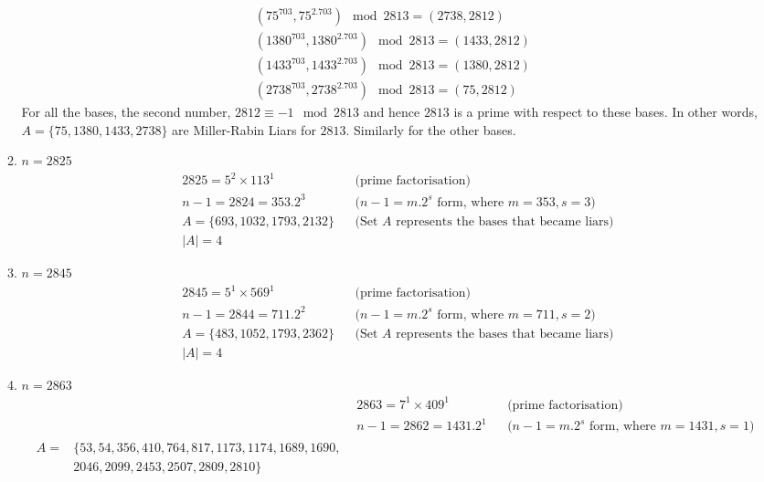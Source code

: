 \documentclass[11pt,a4paper]{article}
\begin{document}
\begin{enumerate}[1.]
\begin{flushleft}
\begin{enumerate}[1.]
				\begin{align}
					(75^{703}, 75^{2.703})\mod 2813 = (2738, 2812)\\
					(1380^{703}, 1380^{2.703})\mod 2813 = (1433, 2812)\\
					(1433^{703}, 1433^{2.703})\mod 2813 = (1380, 2812)\\
					(2738^{703}, 2738^{2.703})\mod 2813 = (75, 2812)
				\end{align}
				For all the bases, the second number, $2812 \equiv -1 \mod 2813$ and hence $2813$ is a prime with respect to these bases. In other words, $A = \{75, 1380, 1433, 2738\}$ are Miller-Rabin Liars for $2813$. Similarly for the other bases.
				\medbreak
				\item $n = 2825$
				\begin{align}
					& 2825 = 5^2 \times 113^1 &&\text{(prime factorisation)}\nonumber\\
					& n - 1 = 2824 = 353.2^3 &&\text{($n - 1 = m.2^s$ form, where $m = 353, s = 3$)}\nonumber\\
					& A = \{693, 1032, 1793, 2132\}&&\text{(Set $A$ represents the bases that became liars)} \nonumber\\
					& |A| = 4 \nonumber
				\end{align}
				\item $n = 2845$
				\begin{align}
					& 2845 = 5^1 \times 569^1 &&\text{(prime factorisation)}\nonumber\\
					& n - 1 = 2844 = 711.2^2 &&\text{($n - 1 = m.2^s$ form, where $m = 711, s = 2$)}\nonumber\\
					& A = \{483, 1052, 1793, 2362\}&&\text{(Set $A$ represents the bases that became liars)} \nonumber\\
					& |A| = 4 \nonumber
				\end{align}
				\item $n = 2863$
				\begin{align}
					& 2863 = 7^1 \times 409^1 &&\text{(prime factorisation)}\nonumber\\
					& n - 1 = 2862 = 1431.2^1 &&\text{($n - 1 = m.2^s$ form, where $m = 1431, s = 1$)}\nonumber\\
					\begin{split}
						A = &\{53, 54, 356, 410, 764, 817, 1173, 1174, 1689, 1690, \\
						&2046, 2099, 2453, 2507, 2809, 2810\} \nonumber\\
					\end{split}\\

\end{align}
\end{enumerate}
\end{flushleft}
\end{enumerate}
\end{document}
